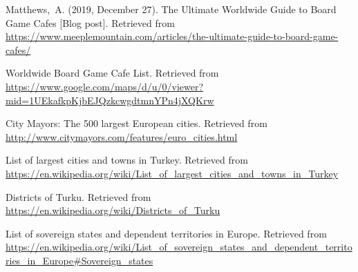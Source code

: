\documentclass{article}
\begin{document}
    

	\begin{thebibliography}{10}

		Matthews,~A. (2019, December 27). The Ultimate Worldwide Guide to Board Game Cafes [Blog post]. Retrieved from \url{https://www.meeplemountain.com/articles/the-ultimate-guide-to-board-game-cafes/}

        Worldwide Board Game Cafe List. Retrieved from \url{https://www.google.com/maps/d/u/0/viewer?mid=1UEkafkpKjbEJQzkcwgdtmnYPn4jXQKrw}

        City Mayors: The 500 largest European cities. Retrieved from \url{http://www.citymayors.com/features/euro_cities.html}

        List of largest cities and towns in Turkey. Retrieved from \url{https://en.wikipedia.org/wiki/List_of_largest_cities_and_towns_in_Turkey}

        Districts of Turku. Retrieved from \url{https://en.wikipedia.org/wiki/Districts_of_Turku}

        List of sovereign states and dependent territories in Europe. Retrieved from \url{https://en.wikipedia.org/wiki/List_of_sovereign_states_and_dependent_territories_in_Europe#Sovereign_states}

	\end{thebibliography}
\end{document}
